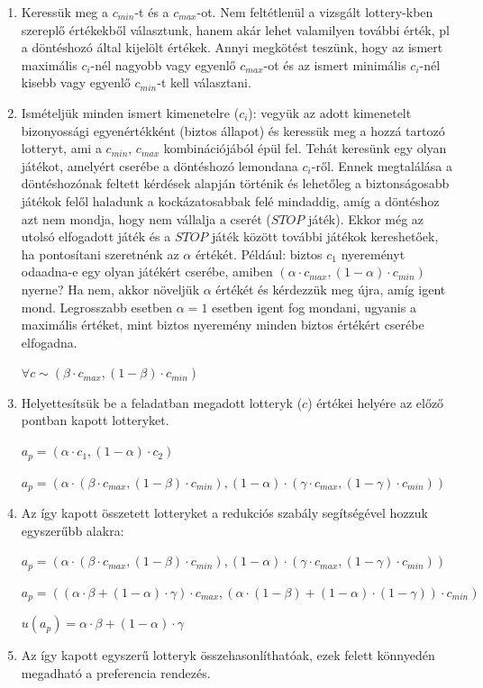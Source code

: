 \documentclass[a4paper,12pt]{article}
\begin{document}
\begin{enumerate}
\item Keressük meg a $c_{min}$-t és a $c_{max}$-ot. Nem feltétlenül a vizsgált lottery-kben szereplő értékekből választunk, hanem akár lehet valamilyen további érték, pl a döntéshozó által kijelölt értékek. Annyi megkötést teszünk, hogy az ismert maximális $c_i$-nél nagyobb vagy egyenlő $c_{max}$-ot és az ismert minimális $c_i$-nél kisebb vagy egyenlő $c_{min}$-t kell választani.
\item Ismételjük minden ismert kimenetelre ($c_i$): vegyük az adott kimenetelt bizonyossági egyenértékként (biztos állapot) és keressük meg a hozzá tartozó lotteryt, ami a $c_{min}$, $c_{max}$ kombinációjából épül fel. Tehát keresünk egy olyan játékot, amelyért cserébe a döntéshozó lemondana $c_i$-ről. Ennek megtalálása a döntéshozónak feltett kérdések alapján történik és lehetőleg a biztonságosabb játékok felől haladunk a kockázatosabbak felé mindaddig, amíg a döntéshoz azt nem mondja, hogy nem vállalja a cserét ($STOP$ játék). Ekkor még az utolsó elfogadott játék és a $STOP$ játék között további játékok kereshetőek, ha pontosítani szeretnénk az $\alpha$ értékét. Például: biztos $c_1$ nyereményt odaadna-e egy olyan játékért cserébe, amiben $(\alpha \cdot c_{max}, (1-\alpha) \cdot c_{min} )$ nyerne? Ha nem, akkor növeljük $\alpha$ értékét és kérdezzük meg újra, amíg igent mond. Legrosszabb esetben $\alpha = 1$ esetben igent fog mondani, ugyanis a maximális értéket, mint biztos nyeremény minden biztos értékért cserébe elfogadna.

$\forall c \sim  (\beta \cdot c_{max},(1-\beta)\cdot c_{min})$
\item Helyettesítsük be a feladatban megadott lotteryk ($c$) értékei helyére az előző pontban kapott lotteryket. 

$a_p = (\alpha \cdot c_1, (1-\alpha) \cdot c_2 ) $

$a_p = (\alpha\cdot(\beta \cdot c_{max},(1-\beta)\cdot c_{min}), (1-\alpha) \cdot(\gamma\cdot c_{max},(1-\gamma)\cdot c_{min})) $

\item Az így kapott összetett lotteryket a redukciós szabály segítségével hozzuk egyszerűbb alakra: 

$a_p = (\alpha\cdot(\beta \cdot c_{max},(1-\beta)\cdot c_{min}), (1-\alpha) \cdot(\gamma\cdot c_{max},(1-\gamma)\cdot c_{min}) )$

$a_p = ((\alpha \cdot \beta + (1-\alpha) \cdot \gamma) \cdot c_{max} , (\alpha \cdot (1-\beta) + (1-\alpha) \cdot (1-\gamma) ) \cdot c_{min} ) $

$u(a_p) = \alpha \cdot \beta + (1-\alpha) \cdot \gamma$


\item Az így kapott egyszerű lotteryk összehasonlíthatóak, ezek felett könnyedén megadható a preferencia rendezés.
\end{enumerate}
\end{document}
